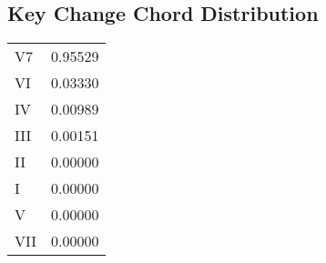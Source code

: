 \subsection{Key Change Chord Distribution}
\begin{tabular}{l l}
V7 & 0.95529 \\
VI & 0.03330 \\
IV & 0.00989 \\
III & 0.00151 \\
II & 0.00000 \\
I & 0.00000 \\
V & 0.00000 \\
VII & 0.00000 \\
\end{tabular}
